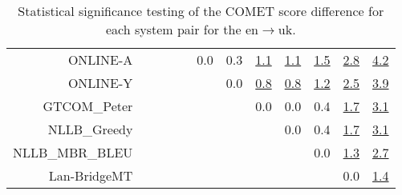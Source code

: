 \documentclass[11pt]{article}
\begin{document}
\begin{sidewaystable}
\begin{center}
{\begin{tabular}{rccccccccccc}
ONLINE-A &  &  &  &  & \cellcolor{red!0} 0.0 & \cellcolor{red!50} 0.3 & \cellcolor{red!70} \underline{1.1} & \cellcolor{red!70} \underline{1.1} & \cellcolor{red!70} \underline{1.5} & \cellcolor{red!70} \underline{2.8} & \cellcolor{red!70} \underline{4.2}\\ 
ONLINE-Y &  &  &  &  &  & \cellcolor{red!0} 0.0 & \cellcolor{red!70} \underline{0.8} & \cellcolor{red!70} \underline{0.8} & \cellcolor{red!70} \underline{1.2} & \cellcolor{red!70} \underline{2.5} & \cellcolor{red!70} \underline{3.9}\\ 
GTCOM\_Peter &  &  &  &  &  &  & \cellcolor{red!0} 0.0 & \cellcolor{red!0} 0.0 & \cellcolor{red!0} 0.4 & \cellcolor{red!70} \underline{1.7} & \cellcolor{red!70} \underline{3.1}\\ 
NLLB\_Greedy &  &  &  &  &  &  &  & \cellcolor{red!0} 0.0 & \cellcolor{red!60} 0.4 & \cellcolor{red!70} \underline{1.7} & \cellcolor{red!70} \underline{3.1}\\ 
NLLB\_MBR\_BLEU &  &  &  &  &  &  &  &  & \cellcolor{red!0} 0.0 & \cellcolor{red!70} \underline{1.3} & \cellcolor{red!70} \underline{2.7}\\ 
Lan-BridgeMT &  &  &  &  &  &  &  &  &  & \cellcolor{red!0} 0.0 & \cellcolor{red!70} \underline{1.4}\\ 
\bottomrule 
\end{tabular} }
\caption{Statistical significance testing of the COMET score difference for each system pair for the en$\rightarrow$uk.} 
 \end{center} \end{sidewaystable} 
\end{document}
